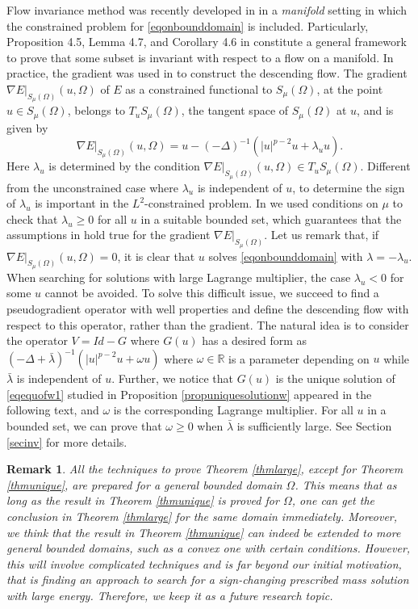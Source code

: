 \documentclass[10pt,a4paper]{article}
\newtheorem{remark}[theorem]{Remark}
\theoremstyle{definition} \theoremstyle{remark}
\numberwithin{equation}{section}
\newcommand{\R}{\mathbb{R}}
\newcommand{\la}{\lambda}
\begin{document}
\vskip0.1in


Flow invariance method was recently developed in \cite{JS} in a \emph{manifold} setting in which the constrained problem for \eqref{eqonbounddomain} is included. Particularly, Proposition 4.5, Lemma 4.7, and Corollary 4.6 in \cite{JS} constitute a general framework to prove that some subset is invariant with respect to a flow on a manifold. In practice, the gradient was used in \cite{JS} to construct the descending flow. The gradient $\nabla E|_{S_\mu(\Omega)}(u,\Omega)$ of $E$ as a constrained functional to $S_\mu(\Omega)$, at the point $u \in S_\mu(\Omega)$, belongs to $T_uS_\mu(\Omega)$, the tangent space of $S_\mu(\Omega)$ at $u$, and is given by $$\nabla E|_{S_\mu(\Omega)}(u,\Omega) = u - (-\Delta)^{-1}(|u|^{p-2}u + \la_u u).$$ Here $\la_u$ is determined by the condition $\nabla E|_{S_\mu(\Omega)}(u,\Omega) \in T_uS_\mu(\Omega)$. Different from the unconstrained case where $\la_u$ is independent of $u$, to determine the sign of $\la_u$ is important in the $L^2$-constrained problem. In \cite{JS} we used conditions on $\mu$ to check that $\la_u \geq 0$ for all $u$ in a suitable bounded set, which guarantees that the assumptions in \cite[Lemma 4.7]{JS} hold true for the gradient $\nabla E|_{S_\mu(\Omega)}$. Let us remark that, if $\nabla E|_{S_\mu(\Omega)}(u,\Omega) = 0$, it is clear that $u$ solves \eqref{eqonbounddomain} with $\la = -\la_u$. When searching for solutions with large Lagrange multiplier, the case $\la_u < 0$ for some $u$ cannot be avoided. To solve this difficult issue, we succeed to find a pseudogradient operator with well properties and define the descending flow with respect to this operator, rather than the gradient. The natural idea is to consider the operator $V = Id - G$ where $G(u)$ has a desired form as $(-\Delta + \bar\la)^{-1}(|u|^{p-2}u + \omega u)$ where $\omega \in \R$ is a parameter depending on $u$ while $\bar\la$ is independent of $u$. Further, we notice that $G(u)$ is the unique solution of \eqref{eqequofw1} studied in Proposition \ref{propuniquesolutionw} appeared in the following text, and $\omega$ is the corresponding Lagrange multiplier. For all $u$ in a bounded set, we can prove that $\omega \geq 0$ when $\bar \la$ is sufficiently large.
See Section \ref{secinv} for more details.




	\begin{remark}
{All the techniques to prove Theorem \ref{thmlarge}, except for Theorem \ref{thmunique}, are prepared for a general bounded domain $\Omega$. This means that as long as the result in Theorem \ref{thmunique} is proved for $\Omega$, one can get the conclusion in Theorem \ref{thmlarge} for the same domain immediately. Moreover, we think that the result in Theorem \ref{thmunique}  can indeed be extended to more general bounded domains, such as a convex one with certain conditions. However, this will involve complicated techniques and is far beyond our initial motivation, that is finding an approach to search for a sign-changing prescribed mass solution with large energy. Therefore,  we keep  it as a future research topic.}
\end{remark}
\end{document}
